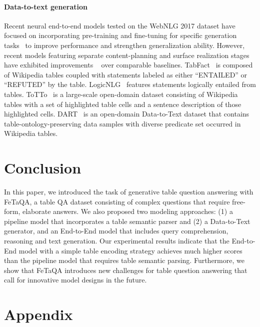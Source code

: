 \documentclass[11pt,a4paper]{article}
\newcommand{\ours}{FeTaQA\xspace}
\begin{document}
\paragraph{Data-to-text generation}
Recent neural end-to-end models tested on the WebNLG 2017 dataset \cite{gardent-etal-2017-webnlg} have focused on incorporating pre-training and fine-tuning for specific generation tasks~\cite{Chen2020KGPTKP,kale2020text} to improve performance and strengthen generalization ability. 
However, recent models featuring separate content-planning and surface realization stages have exhibited improvements ~\cite{moryossef2019stepbystep,iso2020learning} over comparable baselines. 
TabFact~\cite{Chen2020TabFactAL} is composed of Wikipedia tables coupled with statements labeled as either ``ENTAILED'' or ``REFUTED'' by the table. LogicNLG~\cite{Chen2020LogicalNL} features statements logically entailed from tables. 
ToTTo~\cite{parikh-etal-2020-totto} is a large-scale open-domain dataset consisting of Wikipedia tables with a set of highlighted table cells and a sentence description of those highlighted cells. DART~\cite{dart} is an open-domain Data-to-Text dataset that contains table-ontology-preserving data samples with diverse predicate set occurred in Wikipedia tables.

\section{Conclusion}
In this paper, we introduced the task of 
generative table question answering with \ours, a table QA dataset consisting of complex questions that require free-form, elaborate answers. We also proposed two modeling approaches: (1) a pipeline model that incorporates a table semantic parser and (2) a Data-to-Text generator, and an End-to-End model that includes query comprehension, reasoning and text generation. Our experimental results indicate that the End-to-End model with a simple table encoding strategy achieves much higher scores than the pipeline model that requires table semantic parsing. Furthermore, we show that \ours introduces new challenges for table question answering that call for innovative model designs in the future.




\clearpage
\newpage
\appendix
\section{Appendix}
\label{sec:appendix}
\end{document}
